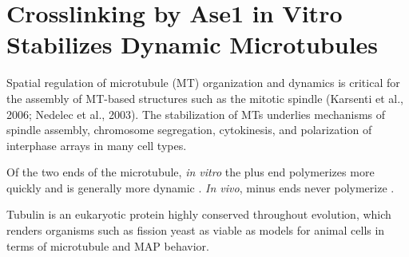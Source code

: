 \section{Crosslinking by Ase1 in Vitro Stabilizes Dynamic Microtubules}
Spatial regulation of microtubule (MT) organization and dynamics is critical for the assembly of MT-based structures such as the mitotic spindle (Karsenti et al., 2006; Nedelec et al., 2003). The stabilization of MTs underlies mechanisms of spindle assembly, chromosome segregation, cytokinesis, and polarization of interphase arrays in many cell types. 


 Of the two ends of the microtubule, \textit{in vitro} the plus end polymerizes more quickly and is generally more dynamic \parencite{Howard2003}. \textit{In vivo}, minus ends never polymerize \parencite{Dammermann2003R614}. %
 \FloatBarrier
 
 Tubulin is an eukaryotic protein highly conserved throughout evolution, which renders organisms such as fission yeast as viable as models for animal cells in terms of microtubule and MAP behavior.
